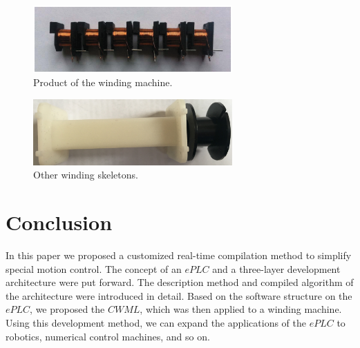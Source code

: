 \documentclass[journal]{IEEEtran}
\begin{document}
\begin{figure}
	\centering
	\includegraphics[width=3in]{fig/FIG16_TII-18-0024.eps}
	\caption{Product of the winding machine.}
	\label{fig:result}
\end{figure}

\begin{figure}
	\centering
	\includegraphics[width=3in]{fig/FIG17_TII-18-0024.eps}
	\caption{Other winding skeletons.}
	\label{fig:result_2}
\end{figure}


  
\section{Conclusion}
\label{conclusion}
In this paper we proposed a customized real-time compilation method to simplify special motion control. The concept of an $ePLC$ and a three-layer development architecture were put forward. The description method and compiled algorithm of the architecture were introduced in detail. Based on the software structure on the $ePLC$, we proposed the $CWML$, which was then applied to a winding machine. Using this development method, we can expand the applications of the $ePLC$ to robotics, numerical control machines, and so on.



\ifCLASSOPTIONcaptionsoff
  \newpage
\fi





%
%
%
\end{document}
